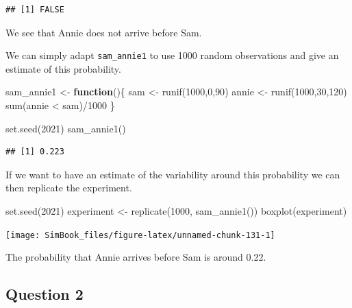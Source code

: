 \documentclass[
]{book}
\newenvironment{Shaded}{\begin{snugshade}}{\end{snugshade}}
\newcommand{\ControlFlowTok}[1]{\textcolor[rgb]{0.13,0.29,0.53}{\textbf{#1}}}
\newcommand{\DecValTok}[1]{\textcolor[rgb]{0.00,0.00,0.81}{#1}}
\newcommand{\FunctionTok}[1]{\textcolor[rgb]{0.00,0.00,0.00}{#1}}
\newcommand{\NormalTok}[1]{#1}
\newcommand{\OtherTok}[1]{\textcolor[rgb]{0.56,0.35,0.01}{#1}}
\newcommand{\SpecialCharTok}[1]{\textcolor[rgb]{0.00,0.00,0.00}{#1}}
\begin{document}
\begin{verbatim}
## [1] FALSE
\end{verbatim}

We see that Annie does not arrive before Sam.

We can simply adapt \texttt{sam\_annie1} to use 1000 random observations and give an estimate of this probability.

\begin{Shaded}
\begin{Highlighting}[]
\NormalTok{sam\_annie1 }\OtherTok{\textless{}{-}} \ControlFlowTok{function}\NormalTok{()\{}
\NormalTok{  sam }\OtherTok{\textless{}{-}} \FunctionTok{runif}\NormalTok{(}\DecValTok{1000}\NormalTok{,}\DecValTok{0}\NormalTok{,}\DecValTok{90}\NormalTok{)}
\NormalTok{  annie }\OtherTok{\textless{}{-}} \FunctionTok{runif}\NormalTok{(}\DecValTok{1000}\NormalTok{,}\DecValTok{30}\NormalTok{,}\DecValTok{120}\NormalTok{)}
  \FunctionTok{sum}\NormalTok{(annie }\SpecialCharTok{\textless{}}\NormalTok{ sam)}\SpecialCharTok{/}\DecValTok{1000}
\NormalTok{\}}

\FunctionTok{set.seed}\NormalTok{(}\DecValTok{2021}\NormalTok{)}
\FunctionTok{sam\_annie1}\NormalTok{()}
\end{Highlighting}
\end{Shaded}

\begin{verbatim}
## [1] 0.223
\end{verbatim}

If we want to have an estimate of the variability around this probability we can then replicate the experiment.

\begin{Shaded}
\begin{Highlighting}[]
\FunctionTok{set.seed}\NormalTok{(}\DecValTok{2021}\NormalTok{)}
\NormalTok{experiment }\OtherTok{\textless{}{-}} \FunctionTok{replicate}\NormalTok{(}\DecValTok{1000}\NormalTok{, }\FunctionTok{sam\_annie1}\NormalTok{())}
\FunctionTok{boxplot}\NormalTok{(experiment)}
\end{Highlighting}
\end{Shaded}

\begin{center}\texttt{[image: SimBook\_files/figure-latex/unnamed-chunk-131-1]} \end{center}

The probability that Annie arrives before Sam is around 0.22.

\hypertarget{question-2-1}{%
\subsection{Question 2}\label{question-2-1}}
\end{document}
